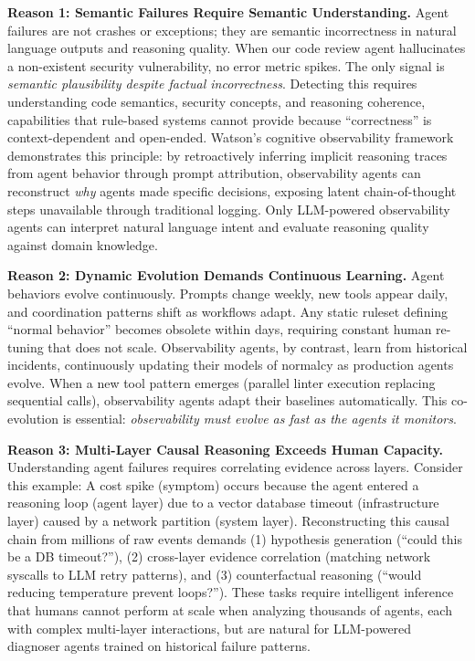 \documentclass[sigplan,screen,9pt]{acmart}
\begin{document}
\textbf{Reason 1: Semantic Failures Require Semantic Understanding.} Agent failures are not crashes or exceptions; they are semantic incorrectness in natural language outputs and reasoning quality. When our code review agent hallucinates a non-existent security vulnerability, no error metric spikes. The only signal is \emph{semantic plausibility despite factual incorrectness}. Detecting this requires understanding code semantics, security concepts, and reasoning coherence, capabilities that rule-based systems cannot provide because ``correctness'' is context-dependent and open-ended. Watson's cognitive observability framework~\cite{Rombaut2025Watson} demonstrates this principle: by retroactively inferring implicit reasoning traces from agent behavior through prompt attribution, observability agents can reconstruct \emph{why} agents made specific decisions, exposing latent chain-of-thought steps unavailable through traditional logging. Only LLM-powered observability agents can interpret natural language intent and evaluate reasoning quality against domain knowledge.

\textbf{Reason 2: Dynamic Evolution Demands Continuous Learning.} Agent behaviors evolve continuously. Prompts change weekly, new tools appear daily, and coordination patterns shift as workflows adapt. Any static ruleset defining ``normal behavior'' becomes obsolete within days, requiring constant human re-tuning that does not scale. Observability agents, by contrast, learn from historical incidents, continuously updating their models of normalcy as production agents evolve. When a new tool pattern emerges (parallel linter execution replacing sequential calls), observability agents adapt their baselines automatically. This co-evolution is essential: \emph{observability must evolve as fast as the agents it monitors}.

\textbf{Reason 3: Multi-Layer Causal Reasoning Exceeds Human Capacity.} Understanding agent failures requires correlating evidence across layers. Consider this example: A cost spike (symptom) occurs because the agent entered a reasoning loop (agent layer) due to a vector database timeout (infrastructure layer) caused by a network partition (system layer). Reconstructing this causal chain from millions of raw events demands (1) hypothesis generation (``could this be a DB timeout?''), (2) cross-layer evidence correlation (matching network syscalls to LLM retry patterns), and (3) counterfactual reasoning (``would reducing temperature prevent loops?''). These tasks require intelligent inference that humans cannot perform at scale when analyzing thousands of agents, each with complex multi-layer interactions, but are natural for LLM-powered diagnoser agents trained on historical failure patterns.
\end{document}
